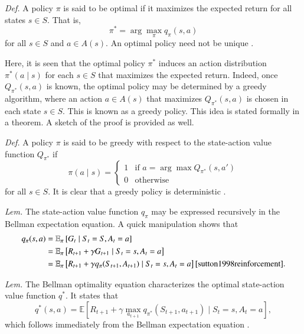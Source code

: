 \documentclass[final,5p,times,twocolumn]{elsarticle}
\begin{document}

\textit{Def.} A policy $\pi$ is said to be optimal if it maximizes the expected return for all states $s \in S$. That is,
$$\pi^{*} = \arg \max_{\pi} q_{\pi}(s, a)$$
for all $s \in S$ and $a \in A(s)$. An optimal policy need not be unique \cite{sutton1998reinforcement}.

Here, it is seen that the optimal policy $\pi^{*}$ induces an action distribution $\pi^{*}(a \mid s)$ for each $s \in S$ that maximizes the expected return. Indeed, once $Q_{\pi^{*}}(s, a)$ is known, the optimal policy may be determined by a greedy algorithm, where an action $a \in A(s)$ that maximizes $Q_{\pi^{*}}(s, a)$ is chosen in each state $s \in S$. This is known as a greedy policy. This idea is stated formally in a theorem. A sketch of the proof is provided as well.

\textit{Def.} A policy $\pi$ is said to be greedy with respect to the state-action value function $Q_{\pi^{*}}$ if
$$\pi(a \mid s) = \begin{cases}
    1 & \text{if } a = \arg \max Q_{\pi^{*}}(s, a') \\
    0 & \text{otherwise} \end{cases}$$
for all $s \in S$. It is clear that a greedy policy is deterministic \cite{sutton1998reinforcement}.

\textit{Lem.} The state-action value function $q_{\pi}$ may be expressed recursively in the Bellman expectation equation. A quick manipulation shows that  
\begin{align*}
  q_{\pi}(s, a) &= \mathbb{E}_{\pi} \left[ G_{t} \mid S_{t} = S, A_{t} = a \right] \\
                &= \mathbb{E}_{\pi} \left[ R_{t+1} + \gamma G_{t+1} \mid S_{t} = s, A_{t} = a \right] \\
                &= \mathbb{E}_{\pi} \left[ R_{t+1} + \gamma q_{\pi}(S_{t+1}, A_{t+1}) \mid S_{t} = s, A_{t} = a \right] \cite{sutton1998reinforcement}.
\end{align*}

\textit{Lem.} The Bellman optimality equation characterizes the optimal state-action value function $q^{*}$. It states that 
$$q^{*}(s, a) = \mathbb{E} \left[ R_{t+1} + \gamma \max_{a_{t+1}} q_{\pi^{*}}(S_{t+1}, a_{t+1}) \mid S_{t} = s, A_{t} = a \right],$$
which follows immediately from the Bellman expectation equation \cite{sutton1998reinforcement}.
\end{document}
